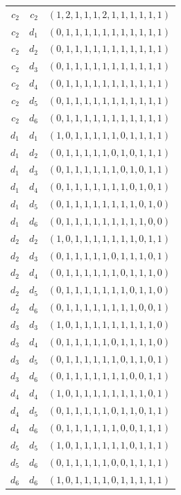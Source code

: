 \begin{longtable}{rrl}
$c_{2}$ & $c_{2}$ & $(1,2,1,1,1,2,1,1,1,1,1,1)$\\
$c_{2}$ & $d_{1}$ & $(0,1,1,1,1,1,1,1,1,1,1,1)$\\
$c_{2}$ & $d_{2}$ & $(0,1,1,1,1,1,1,1,1,1,1,1)$\\
$c_{2}$ & $d_{3}$ & $(0,1,1,1,1,1,1,1,1,1,1,1)$\\
$c_{2}$ & $d_{4}$ & $(0,1,1,1,1,1,1,1,1,1,1,1)$\\
$c_{2}$ & $d_{5}$ & $(0,1,1,1,1,1,1,1,1,1,1,1)$\\
$c_{2}$ & $d_{6}$ & $(0,1,1,1,1,1,1,1,1,1,1,1)$\\
$d_{1}$ & $d_{1}$ & $(1,0,1,1,1,1,1,0,1,1,1,1)$\\
$d_{1}$ & $d_{2}$ & $(0,1,1,1,1,1,0,1,0,1,1,1)$\\
$d_{1}$ & $d_{3}$ & $(0,1,1,1,1,1,1,0,1,0,1,1)$\\
$d_{1}$ & $d_{4}$ & $(0,1,1,1,1,1,1,1,0,1,0,1)$\\
$d_{1}$ & $d_{5}$ & $(0,1,1,1,1,1,1,1,1,0,1,0)$\\
$d_{1}$ & $d_{6}$ & $(0,1,1,1,1,1,1,1,1,1,0,0)$\\
$d_{2}$ & $d_{2}$ & $(1,0,1,1,1,1,1,1,1,0,1,1)$\\
$d_{2}$ & $d_{3}$ & $(0,1,1,1,1,1,0,1,1,1,0,1)$\\
$d_{2}$ & $d_{4}$ & $(0,1,1,1,1,1,1,0,1,1,1,0)$\\
$d_{2}$ & $d_{5}$ & $(0,1,1,1,1,1,1,1,0,1,1,0)$\\
$d_{2}$ & $d_{6}$ & $(0,1,1,1,1,1,1,1,1,0,0,1)$\\
$d_{3}$ & $d_{3}$ & $(1,0,1,1,1,1,1,1,1,1,1,0)$\\
$d_{3}$ & $d_{4}$ & $(0,1,1,1,1,1,0,1,1,1,1,0)$\\
$d_{3}$ & $d_{5}$ & $(0,1,1,1,1,1,1,0,1,1,0,1)$\\
$d_{3}$ & $d_{6}$ & $(0,1,1,1,1,1,1,1,0,0,1,1)$\\
$d_{4}$ & $d_{4}$ & $(1,0,1,1,1,1,1,1,1,1,0,1)$\\
$d_{4}$ & $d_{5}$ & $(0,1,1,1,1,1,0,1,1,0,1,1)$\\
$d_{4}$ & $d_{6}$ & $(0,1,1,1,1,1,1,0,0,1,1,1)$\\
$d_{5}$ & $d_{5}$ & $(1,0,1,1,1,1,1,1,0,1,1,1)$\\
$d_{5}$ & $d_{6}$ & $(0,1,1,1,1,1,0,0,1,1,1,1)$\\
$d_{6}$ & $d_{6}$ & $(1,0,1,1,1,1,0,1,1,1,1,1)$\\
\end{longtable}
\endgroup

